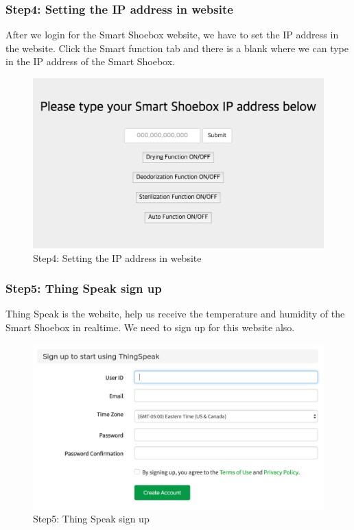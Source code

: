 \documentclass[conference]{IEEEtran}
\begin{document}
\subsubsection{Step4: Setting the IP address in website}
After we login for the Smart Shoebox website, we have to set the IP address in the website. Click the Smart function tab and there is a blank where we can type in the IP address of the Smart Shoebox.
\begin{figure}[H]
\begin{center}
    \includegraphics[scale=0.35]{step4}
    \caption{Step4: Setting the IP address in website} \label{fig:label}
\end{center}
\end{figure}
\subsubsection{Step5: Thing Speak sign up}
Thing Speak is the website, help us receive the temperature and humidity of the Smart Shoebox in realtime. We need to sign up for this website also.
\begin{figure}[H]
\begin{center}
    \includegraphics[scale=0.35]{step5}
    \caption{Step5: Thing Speak sign up} \label{fig:label}
\end{center}
\end{figure}
\end{document}
